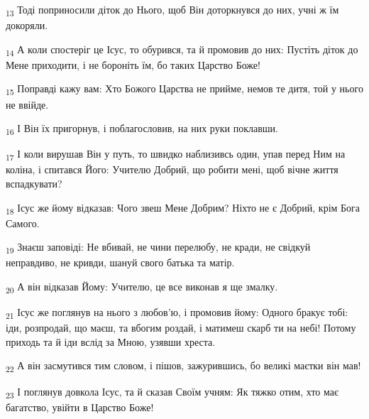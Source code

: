 \begin{tcolorbox}
\textsubscript{13} Тоді поприносили діток до Нього, щоб Він доторкнувся до них, учні ж їм докоряли.
\end{tcolorbox}
\begin{tcolorbox}
\textsubscript{14} А коли спостеріг це Ісус, то обурився, та й промовив до них: Пустіть діток до Мене приходити, і не бороніть їм, бо таких Царство Боже!
\end{tcolorbox}
\begin{tcolorbox}
\textsubscript{15} Поправді кажу вам: Хто Божого Царства не прийме, немов те дитя, той у нього не ввійде.
\end{tcolorbox}
\begin{tcolorbox}
\textsubscript{16} І Він їх пригорнув, і поблагословив, на них руки поклавши.
\end{tcolorbox}
\begin{tcolorbox}
\textsubscript{17} І коли вирушав Він у путь, то швидко наблизивсь один, упав перед Ним на коліна, і спитався Його: Учителю Добрий, що робити мені, щоб вічне життя вспадкувати?
\end{tcolorbox}
\begin{tcolorbox}
\textsubscript{18} Ісус же йому відказав: Чого звеш Мене Добрим? Ніхто не є Добрий, крім Бога Самого.
\end{tcolorbox}
\begin{tcolorbox}
\textsubscript{19} Знаєш заповіді: Не вбивай, не чини перелюбу, не кради, не свідкуй неправдиво, не кривди, шануй свого батька та матір.
\end{tcolorbox}
\begin{tcolorbox}
\textsubscript{20} А він відказав Йому: Учителю, це все виконав я ще змалку.
\end{tcolorbox}
\begin{tcolorbox}
\textsubscript{21} Ісус же поглянув на нього з любов'ю, і промовив йому: Одного бракує тобі: іди, розпродай, що маєш, та вбогим роздай, і матимеш скарб ти на небі! Потому приходь та й іди вслід за Мною, узявши хреста.
\end{tcolorbox}
\begin{tcolorbox}
\textsubscript{22} А він засмутився тим словом, і пішов, зажурившись, бо великі маєтки він мав!
\end{tcolorbox}
\begin{tcolorbox}
\textsubscript{23} І поглянув довкола Ісус, та й сказав Своїм учням: Як тяжко отим, хто має багатство, увійти в Царство Боже!
\end{tcolorbox}
